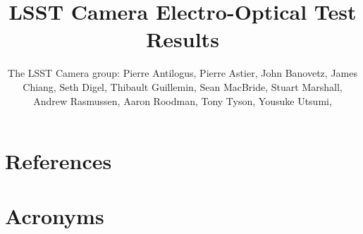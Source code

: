 \documentclass[SE,lsstdraft,authoryear,toc]{lsstdoc}
\title{LSST Camera Electro-Optical Test Results}
\author{%
The LSST Camera group:
Pierre Antilogus,
Pierre Astier,
John Banovetz,
James Chiang,
Seth Digel,
Thibault Guillemin,
Sean MacBride,
Stuart Marshall,
Andrew Rasmussen,
Aaron Roodman,
Tony Tyson,
Yousuke Utsumi,
}
\date{\vcsDate}
\begin{document}
\maketitle


\appendix
\section{References} \label{sec:bib}
%

%


\section{Acronyms} \label{sec:acronyms}

\end{document}
